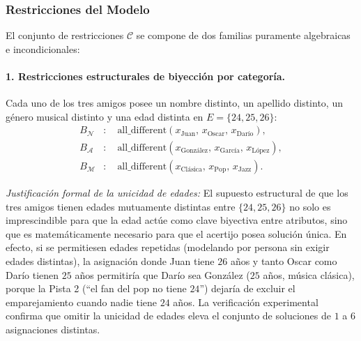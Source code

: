 \subsubsection{Restricciones del Modelo}

El conjunto de restricciones $\mathcal{C}$ se compone de dos familias puramente algebraicas e incondicionales:

\paragraph{1. Restricciones estructurales de biyección por categoría.}
Cada uno de los tres amigos posee un nombre distinto, un apellido distinto, un género musical distinto y una edad distinta en $E = \{24, 25, 26\}$:
\begin{align}
    B_{\mathcal{N}} &: \quad \text{all\_different}(x_{\text{Juan}},\, x_{\text{Oscar}},\, x_{\text{Darío}}), \label{eq:al_bij_n} \\
    B_{\mathcal{A}} &: \quad \text{all\_different}(x_{\text{González}},\, x_{\text{García}},\, x_{\text{López}}), \label{eq:al_bij_a} \\
    B_{\mathcal{M}} &: \quad \text{all\_different}(x_{\text{Clásica}},\, x_{\text{Pop}},\, x_{\text{Jazz}}). \label{eq:al_bij_m}
\end{align}

\emph{Justificación formal de la unicidad de edades:} El supuesto estructural de que los tres amigos tienen edades mutuamente distintas entre $\{24, 25, 26\}$ no solo es imprescindible para que la edad actúe como clave biyectiva entre atributos, sino que es matemáticamente necesario para que el acertijo posea solución única. En efecto, si se permitiesen edades repetidas (modelando por persona sin exigir edades distintas), la asignación donde Juan tiene $26$ años y tanto Oscar como Darío tienen $25$ años permitiría que Darío sea González ($25$ años, música clásica), porque la Pista 2 (``el fan del pop no tiene $24$'') dejaría de excluir el emparejamiento cuando nadie tiene $24$ años. La verificación experimental confirma que omitir la unicidad de edades eleva el conjunto de soluciones de $1$ a $6$ asignaciones distintas.

